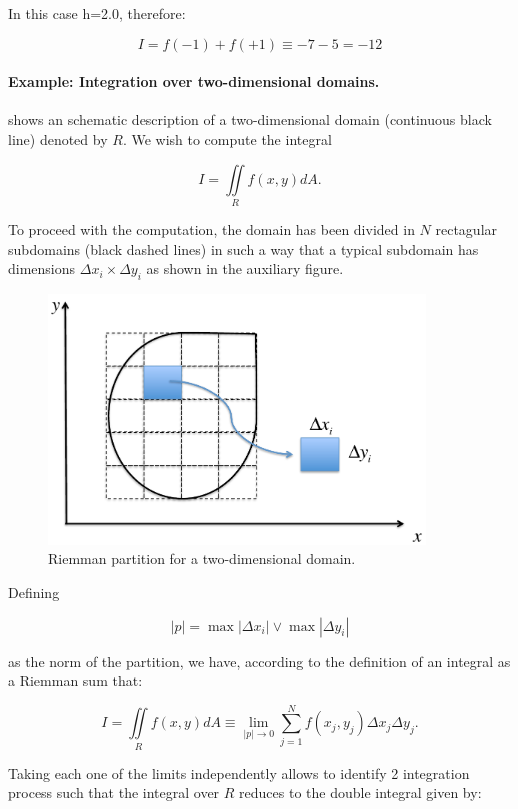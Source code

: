 In this case h=2.0, therefore:

\[I = f( - 1) + f( + 1) \equiv  - 7 - 5 =  - 12\]

\paragraph*{Example: Integration over two-dimensional domains.}
 shows an schematic description of a two-dimensional domain (continuous black line) denoted by $R$. We wish to compute the integral



\[I = \iint\limits_R {f(x,y)dA}. \]

To proceed with the computation, the domain has been divided in $N$ rectagular subdomains (black dashed lines) in such a way that a typical subdomain has dimensions $\Delta {x_i} \times \Delta {y_i}$ as shown in the auxiliary figure.

\begin{figure}[H]
\centering
\includegraphics[width=10cm]{img/rieman.pdf}
\caption{Riemman partition for a two-dimensional domain.}
\label{fig:rieman}
\end{figure}

Defining

\[\left| p \right| = \max \left| {\Delta {x_i}} \right| \vee \max \left| {\Delta {y_i}} \right|\]

as the norm of the partition, we have, according to the definition of an integral as a Riemman sum that:


\[I = \iint\limits_R {f(x,y)dA}  \equiv \mathop {\lim }\limits_{\left| p \right| \to 0} \sum\limits_{j = 1}^N {f({x_j},{y_j})\Delta {x_j}} \Delta {y_j}.\]


Taking each one of the limits independently allows to identify 2 integration process such that the integral over $R$ reduces to the double integral given by:

